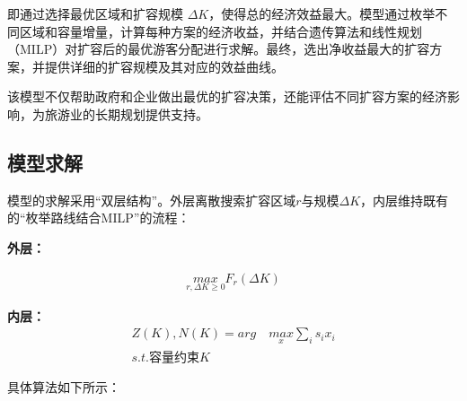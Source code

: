 即通过选择最优区域和扩容规模 $\Delta K$，使得总的经济效益最大。模型通过枚举不同区域和容量增量，计算每种方案的经济收益，并结合遗传算法和线性规划（MILP）对扩容后的最优游客分配进行求解。最终，选出净收益最大的扩容方案，并提供详细的扩容规模及其对应的效益曲线。



该模型不仅帮助政府和企业做出最优的扩容决策，还能评估不同扩容方案的经济影响，为旅游业的长期规划提供支持。

\subsection[\hspace{-2pt}模型求解]{{\heiti{}\hspace{-8pt}模型求解}}\label{subsec:3-model-build}

模型的求解采用“双层结构”。外层离散搜索扩容区域$r$与规模$\Delta K$，内层维持既有的“枚举路线结合MILP”的流程：

\noindent\textbf{外层：}

\begin{equation}
  \begin{aligned}
    \underset{r,\Delta K \geq 0}{max} F_{r}(\Delta K)
  \end{aligned}
\end{equation}

\noindent\textbf{内层：}
\begin{equation}
  \begin{aligned}
    Z(K),N(K)=arg\quad \underset{x}{max} \sum_{i}s_{i}x_{i}\\
    s.t. \text{容量约束}K
  \end{aligned}
\end{equation}

具体算法如下所示：

